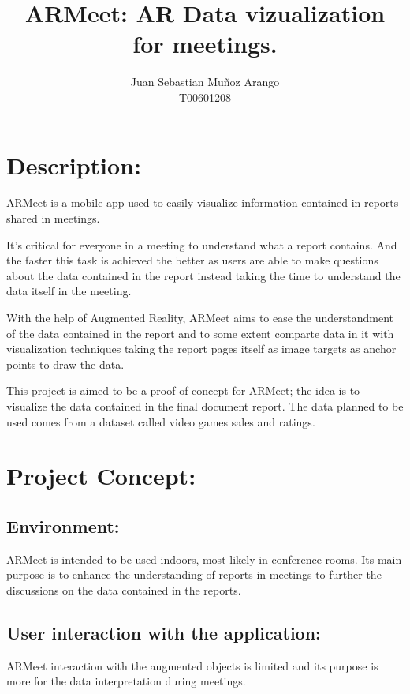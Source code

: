 \documentclass{article}
\begin{document}
\title{ARMeet: AR Data vizualization for meetings.}

\author{Juan Sebastian Mu\~noz Arango \\ T00601208}
\maketitle %

\section{Description:}
ARMeet is a mobile app used to easily visualize information contained in
reports shared in meetings.\newline

It's critical for everyone in a meeting to understand what a report
contains. And the faster this task is achieved the better as users are able
to make questions about the data contained in the report instead taking the
time to understand the data itself in the meeting.\newline

With the help of Augmented Reality, ARMeet aims to ease the understandment of
the data contained in the report and to some extent comparte data in it with
visualization techniques taking the report pages itself as image targets as
anchor points to draw the data.\newline

This project is aimed to be a proof of concept for ARMeet; the idea is to
visualize the data contained in the final document report. The data planned
to be used comes from a dataset called video games sales and ratings.

\section{Project Concept:}
\subsection{Environment:}
ARMeet is intended to be used indoors, most likely in conference
rooms. Its main purpose is to enhance the understanding of reports in
meetings to further the discussions on the data contained in the reports.

\subsection{User interaction with the application:}
ARMeet interaction with the augmented objects is limited and its purpose
is more for the data interpretation during meetings. \newline
\end{document}
